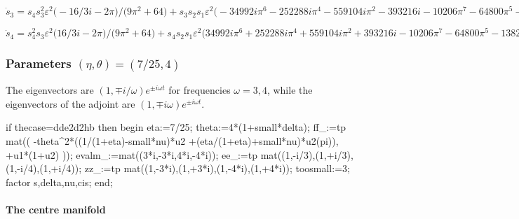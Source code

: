 \documentclass[11pt,a5paper]{article}
\begin{document}
\begin{math}
\dot s_{3}=s_{4} s_{3}^{2} \varepsilon ^{2} \big(-16/3 i-2 \pi \big)/
\big(9 \pi ^{2}+64\big)+s_{3} s_{2} s_{1} \varepsilon ^{2} \big(-34992 i
 \pi ^{6}-252288 i \pi ^{4}-559104 i \pi ^{2}-393216 i-10206 \pi ^{7}-
64800 \pi ^{5}-138240 \pi ^{3}-98304 \pi \big)/\big(6561 \pi ^{8}+116640
 \pi ^{6}+684288 \pi ^{4}+1474560 \pi ^{2}+1048576\big)+s_{3} \delta  
\varepsilon ^{2} \big(128 i+48 \pi \big)/\big(9 \pi ^{2}+64\big)+s_{1}^{
2} \varepsilon  \big(-24 i \pi +64\big)/\big(9 \pi ^{2}+64\big)
\end{math}\par

\begin{math}
\dot s_{4}=s_{4}^{2} s_{3} \varepsilon ^{2} \big(16/3 i-2 \pi \big)/
\big(9 \pi ^{2}+64\big)+s_{4} s_{2} s_{1} \varepsilon ^{2} \big(34992 i 
\pi ^{6}+252288 i \pi ^{4}+559104 i \pi ^{2}+393216 i-10206 \pi ^{7}-
64800 \pi ^{5}-138240 \pi ^{3}-98304 \pi \big)/\big(6561 \pi ^{8}+116640
 \pi ^{6}+684288 \pi ^{4}+1474560 \pi ^{2}+1048576\big)+s_{4} \delta  
\varepsilon ^{2} \big(-128 i+48 \pi \big)/\big(9 \pi ^{2}+64\big)+s_{2}
^{2} \varepsilon  \big(24 i \pi +64\big)/\big(9 \pi ^{2}+64\big)
\end{math}




\subsubsection{Parameters $(\eta,\theta)=(7/25,4)$}
The eigenvectors are \((1,\mp i/\omega)e^{\pm i\omega t}\) for frequencies \(\omega=3,4\), while the eigenvectors of the adjoint are \((1,\mp i\omega)e^{\pm i\omega t}\). 

\begin{reduce}
if thecase=dde2d2hb then begin
eta:=7/25;
theta:=4*(1+small*delta);
ff_:=tp mat((
    -theta^2*((1/(1+eta)-small*nu)*u2
           +(eta/(1+eta)+small*nu)*u2(pi)),
    +u1*(1+u2)
    ));
evalm_:=mat((3*i,-3*i,4*i,-4*i));
ee_:=tp mat((1,-i/3),(1,+i/3),(1,-i/4),(1,+i/4));
zz_:=tp mat((1,-3*i),(1,+3*i),(1,-4*i),(1,+4*i));
toosmall:=3; 
factor s,delta,nu,cis;
end;
\end{reduce}


\paragraph{The centre manifold}
\begin{math}
\end{math}\par
\end{document}
